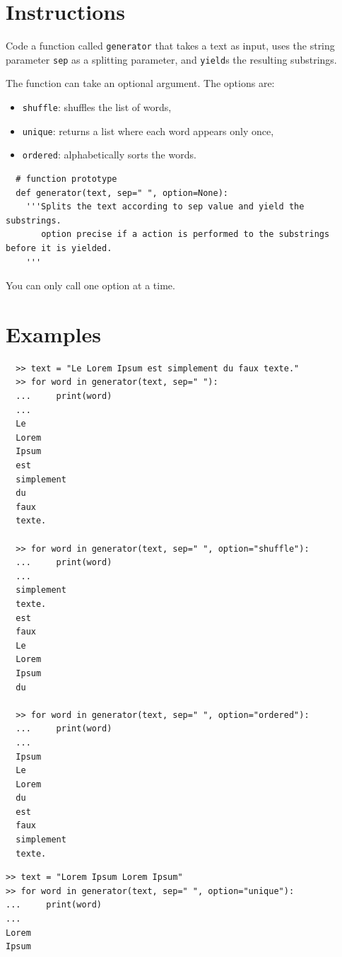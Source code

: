 \documentclass{42-en}
\begin{document}
\section*{Instructions}
Code a function called \texttt{generator} that takes a text as input, uses the string
parameter \texttt{sep} as a splitting parameter, and \texttt{yield}s the resulting substrings.

The function can take an optional argument.
The options are:
\begin{itemize}
  \item \texttt{shuffle}: shuffles the list of words,
  \item \texttt{unique}: returns a list where each word appears only once,
  \item \texttt{ordered}: alphabetically sorts the words.
\end{itemize}

\begin{verbatim}
  # function prototype
  def generator(text, sep=" ", option=None):
    '''Splits the text according to sep value and yield the substrings.
       option precise if a action is performed to the substrings before it is yielded.
    '''
\end{verbatim}

You can only call one option at a time.

\section*{Examples}
\begin{verbatim}
  >> text = "Le Lorem Ipsum est simplement du faux texte."
  >> for word in generator(text, sep=" "):
  ...     print(word)
  ...
  Le
  Lorem
  Ipsum
  est
  simplement
  du
  faux
  texte.

  >> for word in generator(text, sep=" ", option="shuffle"):
  ...     print(word)
  ...
  simplement
  texte.
  est
  faux
  Le
  Lorem
  Ipsum
  du

  >> for word in generator(text, sep=" ", option="ordered"):
  ...     print(word)
  ...
  Ipsum
  Le
  Lorem
  du
  est
  faux
  simplement
  texte.
\end{verbatim}

\begin{verbatim}
>> text = "Lorem Ipsum Lorem Ipsum"
>> for word in generator(text, sep=" ", option="unique"):
...     print(word)
...
Lorem
Ipsum
\end{verbatim}
\end{document}
